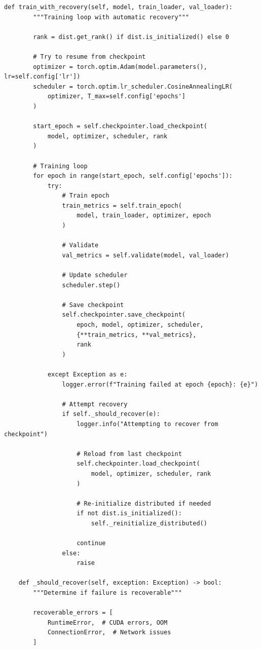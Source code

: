 \begin{lstlisting}[style=python, caption=Robust Checkpointing for Distributed Training]
    def train_with_recovery(self, model, train_loader, val_loader):
        """Training loop with automatic recovery"""

        rank = dist.get_rank() if dist.is_initialized() else 0

        # Try to resume from checkpoint
        optimizer = torch.optim.Adam(model.parameters(), lr=self.config['lr'])
        scheduler = torch.optim.lr_scheduler.CosineAnnealingLR(
            optimizer, T_max=self.config['epochs']
        )

        start_epoch = self.checkpointer.load_checkpoint(
            model, optimizer, scheduler, rank
        )

        # Training loop
        for epoch in range(start_epoch, self.config['epochs']):
            try:
                # Train epoch
                train_metrics = self.train_epoch(
                    model, train_loader, optimizer, epoch
                )

                # Validate
                val_metrics = self.validate(model, val_loader)

                # Update scheduler
                scheduler.step()

                # Save checkpoint
                self.checkpointer.save_checkpoint(
                    epoch, model, optimizer, scheduler,
                    {**train_metrics, **val_metrics},
                    rank
                )

            except Exception as e:
                logger.error(f"Training failed at epoch {epoch}: {e}")

                # Attempt recovery
                if self._should_recover(e):
                    logger.info("Attempting to recover from checkpoint")

                    # Reload from last checkpoint
                    self.checkpointer.load_checkpoint(
                        model, optimizer, scheduler, rank
                    )

                    # Re-initialize distributed if needed
                    if not dist.is_initialized():
                        self._reinitialize_distributed()

                    continue
                else:
                    raise

    def _should_recover(self, exception: Exception) -> bool:
        """Determine if failure is recoverable"""

        recoverable_errors = [
            RuntimeError,  # CUDA errors, OOM
            ConnectionError,  # Network issues
        ]


\end{lstlisting}
